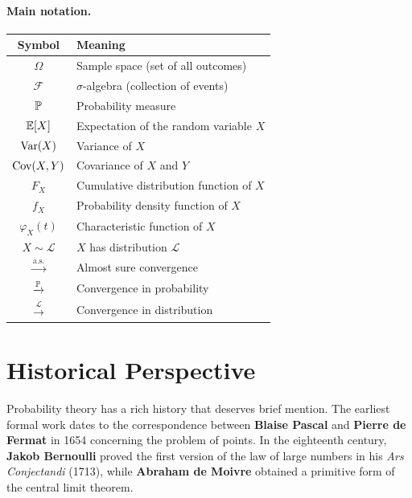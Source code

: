 \paragraph{Main notation.}
\begin{center}
\renewcommand{\arraystretch}{1.3}
\begin{tabular}{cl}
    \toprule
    \textbf{Symbol} & \textbf{Meaning} \\
    \midrule
    $\Omega$ & Sample space (set of all outcomes) \\
    $\mathcal{F}$ & $\sigma$-algebra (collection of events) \\
    $\mathbb{P}$ & Probability measure \\
    $\mathbb{E}[X]$ & Expectation of the random variable $X$ \\
    $\mathrm{Var}(X)$ & Variance of $X$ \\
    $\mathrm{Cov}(X,Y)$ & Covariance of $X$ and $Y$ \\
    $F_X$ & Cumulative distribution function of $X$ \\
    $f_X$ & Probability density function of $X$ \\
    $\varphi_X(t)$ & Characteristic function of $X$ \\
    $X \sim \mathcal{L}$ & $X$ has distribution $\mathcal{L}$ \\
    $\xrightarrow{\text{a.s.}}$ & Almost sure convergence \\
    $\xrightarrow{\mathbb{P}}$ & Convergence in probability \\
    $\xrightarrow{\mathcal{L}}$ & Convergence in distribution \\
    \bottomrule
\end{tabular}
\end{center}

\section*{Historical Perspective}

Probability theory has a rich history that deserves brief mention. The earliest
formal work dates to the correspondence between \textbf{Blaise Pascal} and
\textbf{Pierre de Fermat} in 1654 concerning the problem of points. In the
eighteenth century, \textbf{Jakob Bernoulli} proved the first version of the law
of large numbers in his \textit{Ars Conjectandi} (1713), while \textbf{Abraham
de Moivre} obtained a primitive form of the central limit theorem.

\medskip

